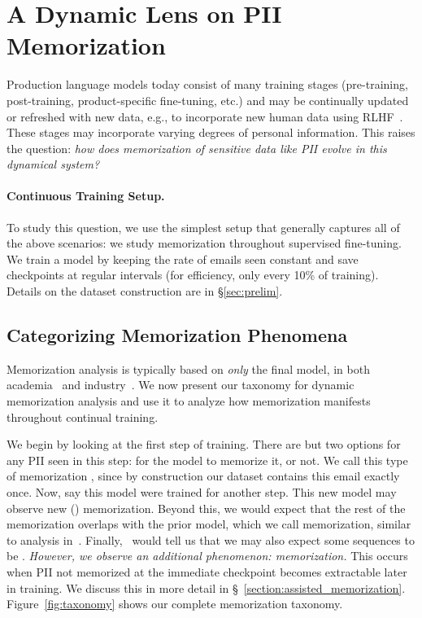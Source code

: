 \section{A Dynamic Lens on PII Memorization}
\label{section:continuous_training}


Production language models today consist of many training stages (pre-training, post-training, product-specific fine-tuning, etc.) and may be continually updated or refreshed with new data, e.g., to incorporate new human data using RLHF~\citep{stiennon2020learning}.
These stages may incorporate varying degrees of personal information.
This raises the question: \emph{how does memorization of sensitive data like PII evolve in this dynamical system?}




\paragraph{Continuous Training Setup.}
To study this question, we use the simplest setup that generally captures all of the above scenarios: we study memorization throughout supervised fine-tuning. We train a model by keeping the rate of emails seen constant and save checkpoints at regular intervals (for efficiency, only every 10\% of training).
Details on the dataset construction are in \S\ref{sec:prelim}. 


\subsection{Categorizing Memorization Phenomena}
\label{sec:taxonomy}


Memorization analysis is typically based on \emph{only} the final model, in both academia~\citep{quantifying} and industry~\citep{team2024gemini,dubey2024llama3herdmodels,team2024gemma2}.
We now present our taxonomy for dynamic memorization analysis and use it to analyze how memorization manifests throughout continual training.

We begin by looking at the first step of training. There are but two options for any PII seen in this step: for the model to memorize it, or not. We call this type of memorization \novel, since by construction our dataset contains this email exactly once. Now, say this model were trained for another step. This new model may observe new (\novel) memorization. Beyond this, we would expect that the rest of the memorization overlaps with the prior model, which we call \retained memorization, similar to analysis in~\citet{biderman2023emergent}. Finally,~\citet{jagielski2022measuring} would tell us that we may also expect some sequences to be \forgotten.
\emph{However, we observe an additional phenomenon: \assisted memorization.} This occurs when PII not memorized at the immediate checkpoint becomes extractable later in training. We discuss this in more detail in \S~\ref{section:assisted_memorization}. Figure~\ref{fig:taxonomy} shows our complete memorization taxonomy. 


